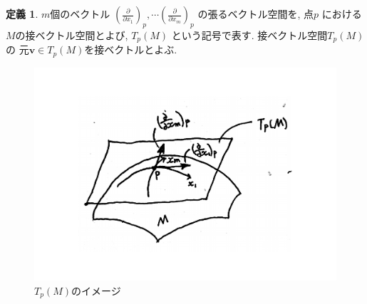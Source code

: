 \documentclass[dvipdfmx,cjk]{beamer}
\theoremstyle{definition}
\newtheorem{dfn}{\textbf{ 定義 }}
\newtheorem{prop}[dfn]{\textbf{ 命題 }}
\begin{document}
\begin{frame}
  \begin{dfn}\label{def:tangent vector space}
    $m$個のベクトル
    $\left(\frac{\partial}{\partial x_1}\right)_p, 
    \cdots 
    \left(\frac{\partial}{\partial x_m}\right)_p$
    の張るベクトル空間を, 点$p$
    における$M$の接ベクトル空間とよび, 
    $T_p(M)$
    という記号で表す. 接ベクトル空間$T_p(M)$の
    元$\boldsymbol{v}\in T_p(M)$を接ベクトルとよぶ. 
  \end{dfn}
  \begin{figure}[H]
        \centering
        \includegraphics[keepaspectratio, scale=0.28]{tangentVectorSpace_2.pdf}
        \caption{$T_p(M)$のイメージ}
        \label{}
  \end{figure}
\end{frame}

\end{document}
